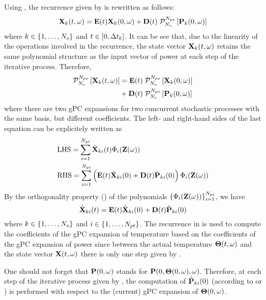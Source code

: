 Using , the recurrence given by  is rewritten as follows:
\[
  \vX_k(\t, \o) = \mE(\t) \vX_k(0, \o) + \mD(\t) \; \oPC{\vars}{\pcorder}{\vP_k(0, \o)}
\]
where $k \in \{ 1, \dotsc, {N_s} \}$ and $t \in [0, \Delta t_k]$. It can be see that, due to the linearity of the operations involved in the recurrence, the state vector $\mathbf{X}_k(t, \omega)$ retains the same polynomial structure as the input vector of power at each step of the iterative process. Therefore,
\begin{align*}
  \oPC{\vars}{\pcorder}{\vX_k(\t, \o)} & = \mE(\t) \; \oPC{\vars}{\pcorder}{\vX_k(0, \o)} \\
  & {} + \mD(\t) \; \oPC{\vars}{\pcorder}{\vP_k(0, \o)}
\end{align*}
where there are two gPC expansions for two cuncurrent stochastic processes with the same basis, but different coefficients. The left- and right-hand sides of the last equation can be explicitely written as
\begin{align*}
  & \text{LHS} = \sum_{i = 1}^{\pcterms} \pcc{\vX}_{ki}(\t) \pcb_i(\vZ(\o)) \\
  & \text{RHS} = \sum_{i = 1}^{\pcterms} \left( \mE(\t) \pcc{\vX}_{ki}(0) + \mD(\t) \pcc{\vP}_{ki}(0) \right) \pcb_i(\vZ(\o))
\end{align*}
By the orthogonality property () of the polynomials $\{ \Phi_i(\mathbf{Z}(\omega)) \}_{i = 1}^{{N_{pt}}}$, we have
\begin{equation} \elabel{pc-recurrence}
  \pcc{\vX}_{ki}(\t) = \mE(\t) \pcc{\vX}_{ki}(0) + \mD(\t) \pcc{\vP}_{ki}(0)
\end{equation}
where $k \in \{ 1, \dots, {N_s} \}$ and $i \in \{ 1, \dotsc, {N_{pt}} \}$. The recurrence in  is used to compute the coefficients of the gPC expansion of temperature based on the coefficients of the gPC expansion of power since between the actual temperature ${\boldsymbol\Theta}(t, \omega)$ and the state vector $\mathbf{X}(t, \omega)$ there is only one step given by .

One should not forget that $\mathbf{P}(0, \omega)$ stands for $\mathbf{P}(0, {\boldsymbol\Theta}(0, \omega), \omega)$. Therefore, at each step of the iterative process given by , the computation of $\hat{\mathbf{P}}_{ki}(0)$ (according to  or ) is performed with respect to the (current) gPC expansion of ${\boldsymbol\Theta}(0, \omega)$.
